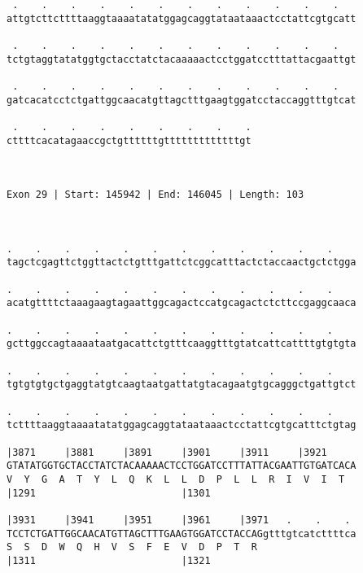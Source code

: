 \documentclass{article}
\begin{document}
\begin{Verbatim}
 .    .    .    .    .    .    .    .    .    .    .    .   
attgtcttcttttaaggtaaaatatatggagcaggtataataaactcctattcgtgcatt
                                                            
 .    .    .    .    .    .    .    .    .    .    .    .   
tctgtaggtatatggtgctacctatctacaaaaactcctggatcctttattacgaattgt
                                                            
 .    .    .    .    .    .    .    .    .    .    .    .   
gatcacatcctctgattggcaacatgttagctttgaagtggatcctaccaggtttgtcat
                                                            
 .    .    .    .    .    .    .    .    .
cttttcacatagaaccgctgttttttgtttttttttttttgt
                                          
                                          
 
Exon 29 | Start: 145942 | End: 146045 | Length: 103



.    .    .    .    .    .    .    .    .    .    .    .    
tagctcgagttctggttactctgtttgattctcggcatttactctaccaactgctctgga
                                                            
.    .    .    .    .    .    .    .    .    .    .    .    
acatgttttctaaagaagtagaattggcagactccatgcagactctcttccgaggcaaca
                                                            
.    .    .    .    .    .    .    .    .    .    .    .    
gcttggccagtaaaataatgacattctgtttcaaggtttgtatcattcattttgtgtgta
                                                            
.    .    .    .    .    .    .    .    .    .    .    .    
tgtgtgtgctgaggtatgtcaagtaatgattatgtacagaatgtgcagggctgattgtct
                                                            
.    .    .    .    .    .    .    .    .    .    .    .    
tcttttaaggtaaaatatatggagcaggtataataaactcctattcgtgcatttctgtag
                                                            
|3871     |3881     |3891     |3901     |3911     |3921     
GTATATGGTGCTACCTATCTACAAAAACTCCTGGATCCTTTATTACGAATTGTGATCACA
V  Y  G  A  T  Y  L  Q  K  L  L  D  P  L  L  R  I  V  I  T  
|1291                         |1301                         
  
|3931     |3941     |3951     |3961     |3971   .    .    . 
TCCTCTGATTGGCAACATGTTAGCTTTGAAGTGGATCCTACCAGgtttgtcatcttttca
S  S  D  W  Q  H  V  S  F  E  V  D  P  T  R                 
|1311                         |1321                         
  

\end{Verbatim}
\end{document}
